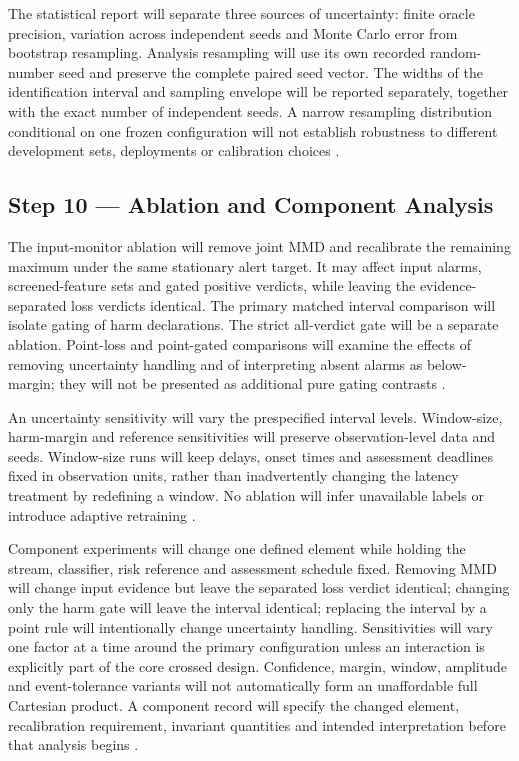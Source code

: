 The statistical report will separate three sources of uncertainty: finite oracle precision, variation across independent seeds and Monte Carlo error from bootstrap resampling. Analysis resampling will use its own recorded random-number seed and preserve the complete paired seed vector. The widths of the identification interval and sampling envelope will be reported separately, together with the exact number of independent seeds. A narrow resampling distribution conditional on one frozen configuration will not establish robustness to different development sets, deployments or calibration choices \cite{hoeffding,souza,nist}.

\subsection*{Step 10 --- Ablation and Component Analysis}
The input-monitor ablation will remove joint MMD and recalibrate the remaining maximum under the same stationary alert target. It may affect input alarms, screened-feature sets and gated positive verdicts, while leaving the evidence-separated loss verdicts identical. The primary matched interval comparison will isolate gating of harm declarations. The strict all-verdict gate will be a separate ablation. Point-loss and point-gated comparisons will examine the effects of removing uncertainty handling and of interpreting absent alarms as below-margin; they will not be presented as additional pure gating contrasts \cite{greco,gretton}.

An uncertainty sensitivity will vary the prespecified interval levels. Window-size, harm-margin and reference sensitivities will preserve observation-level data and seeds. Window-size runs will keep delays, onset times and assessment deadlines fixed in observation units, rather than inadvertently changing the latency treatment by redefining a window. No ablation will infer unavailable labels or introduce adaptive retraining \cite{alencar,cerqueira}.

Component experiments will change one defined element while holding the stream, classifier, risk reference and assessment schedule fixed. Removing MMD will change input evidence but leave the separated loss verdict identical; changing only the harm gate will leave the interval identical; replacing the interval by a point rule will intentionally change uncertainty handling. Sensitivities will vary one factor at a time around the primary configuration unless an interaction is explicitly part of the core crossed design. Confidence, margin, window, amplitude and event-tolerance variants will not automatically form an unaffordable full Cartesian product. A component record will specify the changed element, recalibration requirement, invariant quantities and intended interpretation before that analysis begins \cite{cerqueira,alencar,gretton}.

